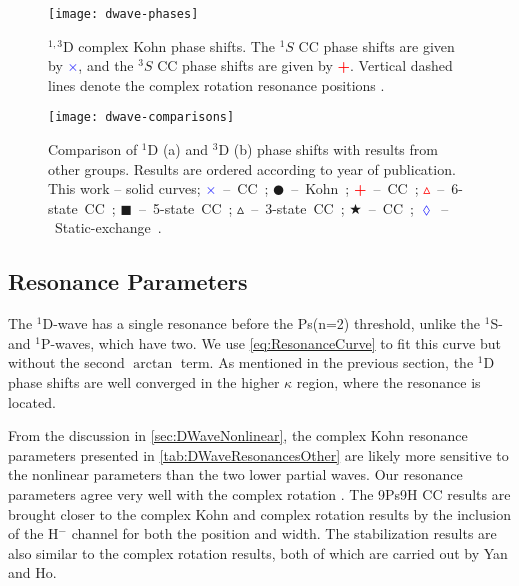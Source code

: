 \documentclass[Dissertation.tex]{subfiles}
\begin{document}
\begin{figure}
	\centering
	\texttt{[image: dwave-phases]}
	\caption[$^{1,3}$D phase shifts]{$^{1,3}$D complex Kohn phase shifts. The $^1S$ CC phase shifts
\cite{Walters2004} are given by \mbox{\textcolor{blue}{$\times$}}, and the
$^3S$ CC phase shifts \cite{Blackwood2002} are given by
\mbox{\textcolor{red}{\textbf{+}}}. Vertical dashed lines denote the complex rotation resonance
positions \cite{Ho1998}.}
	\label{fig:DWavePhase}
\end{figure}

\begin{figure}
	\centering
	\texttt{[image: dwave-comparisons]}
	\caption[Comparison of D-wave phase shifts]{Comparison of $^1$D (a) and $^3$D (b) phase shifts with results from other groups. Results are ordered according to year of publication. This work -- solid curves; \mbox{\textcolor{blue}{$\times$} -- CC \cite{Walters2004};} \mbox{$\CIRCLE$ -- Kohn \cite{VanReeth2003};} \mbox{\textcolor{red}{\textbf{+}} -- CC \cite{Blackwood2002};} \mbox{\textcolor{red}{$\vartriangle$} -- 6-state CC \cite{Sinha2000};} \mbox{$\blacksquare$ -- 5-state CC \cite{Adhikari1999};} \mbox{$\vartriangle$ -- 3-state CC \cite{Sinha1997};} \mbox{\textcolor[RGB]{0,127,0}{$\bigstar$} -- CC \cite{Ray1997};} \mbox{\textcolor{blue}{$\lozenge$} -- Static-exchange \cite{Hara1975}.}}
	\label{fig:DWaveComparisons}
\end{figure}


\subsection{Resonance Parameters}
\label{sec:DWaveResonance}

The $^1$D-wave has a single resonance before the Ps(n=2) threshold, unlike 
the $^1$S- and $^1$P-waves, which have two. We use \cref{eq:ResonanceCurve}
to fit this curve but without the second $\arctan$ term.
As mentioned in the previous section, the $^1$D phase shifts are
well converged in the higher $\kappa$ region, where the resonance
is located.

From the discussion in \cref{sec:DWaveNonlinear}, the complex Kohn resonance 
parameters presented in \cref{tab:DWaveResonancesOther} are likely more 
sensitive to the nonlinear parameters than the two lower partial waves. Our 
resonance parameters agree very well with the complex rotation \cite{Ho1998}.
The 9Ps9H CC results \cite{Blackwood2002} are brought closer to the complex
Kohn and complex rotation results by the inclusion of the H$^-$ channel for
both the position and width. The stabilization \cite{Yan2003} results are
also similar to the complex rotation results, both of which are carried out by
Yan and Ho.
\end{document}
